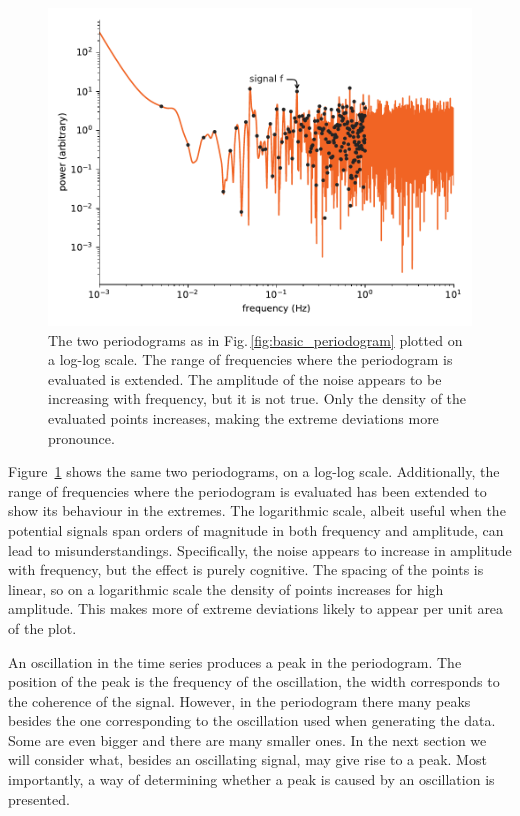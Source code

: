 \begin{figure}
  \centering
  \includegraphics[width=\linewidth]{gfx/axions/basic_periodogram_loglog.pdf}
  \caption{The two periodograms as in Fig.\,\ref{fig:basic_periodogram} plotted on a log-log scale. The range of frequencies where the periodogram is evaluated is extended. The amplitude of the noise appears to be increasing with frequency, but it is not true. Only the density of the evaluated points increases, making the extreme deviations more pronounce.}\label{fig:basic_periodogram_loglog}
\end{figure}

Figure~\ref{fig:basic_periodogram_loglog} shows the same two periodograms, on a log-log scale. Additionally, the range of frequencies where the periodogram is evaluated has been extended to show its behaviour in the extremes. The logarithmic scale, albeit useful when the potential signals span orders of magnitude in both frequency and amplitude, can lead to misunderstandings. Specifically, the noise appears to increase in amplitude with frequency, but the effect is purely cognitive. The spacing of the points is linear, so on a logarithmic scale the density of points increases for high amplitude. This makes more of extreme deviations likely to appear per unit area of the plot.%

An oscillation in the time series produces a peak in the periodogram. The position of the peak is the frequency of the oscillation, the width corresponds to the coherence of the signal. However, in the periodogram there many peaks besides the one corresponding to the oscillation used when generating the data. Some are even bigger and there are many smaller ones. In the next section we will consider what, besides an oscillating signal, may give rise to a peak. Most importantly, a way of determining whether a peak is caused by an oscillation is presented.




